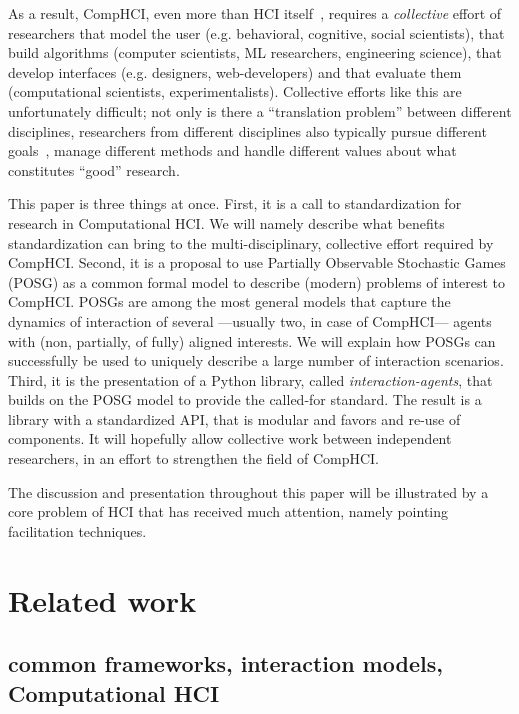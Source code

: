 \documentclass[12pt,a4paper]{article}
\begin{document}
As a result, CompHCI, even more than HCI itself~\cite{blackwell2015}, requires a \emph{collective} effort of researchers that model the user (e.g. behavioral, cognitive, social scientists), that build algorithms (computer scientists, ML researchers, engineering science), that develop interfaces (e.g. designers, web-developers) and that evaluate them (computational scientists, experimentalists). Collective efforts like this are unfortunately difficult; not only is there a ``translation problem'' between different disciplines, researchers from different disciplines also typically pursue different goals~\cite{blackwell2015}, manage different methods and handle different values about what constitutes ``good'' research.




This paper is three things at once. First, it is a call to standardization for research in Computational HCI. We will namely describe what benefits standardization can bring to the multi-disciplinary, collective effort required by CompHCI. 
Second, it is a proposal to use Partially Observable Stochastic Games (POSG) as a common formal model to describe (modern) problems of interest to CompHCI. POSGs are among the most general models that capture the dynamics of interaction of several ---usually two, in case of CompHCI--- agents with (non, partially, of fully) aligned interests. We will explain how POSGs can successfully be used to uniquely describe a large number of interaction scenarios.
Third, it is the presentation of a Python library, called \emph{interaction-agents}, that builds on the POSG model to provide the called-for standard. 
The result is a library with a standardized API, that is modular and favors and re-use of components. It will hopefully allow collective work between independent researchers, in an effort to strengthen the field of CompHCI.


The discussion and presentation throughout this paper will be illustrated by a core problem of HCI that has received much attention, namely pointing facilitation techniques.

\section{Related work}



\subsection{common frameworks, interaction models, Computational HCI}
\end{document}
